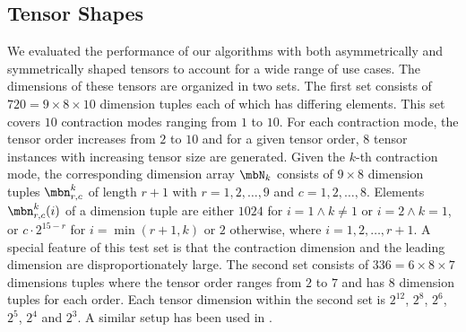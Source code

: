 \subsection{Tensor Shapes} 
We evaluated the performance of our algorithms with both asymmetrically and symmetrically shaped tensors to account for a wide range of use cases. 
The dimensions of these tensors are organized in two sets. 
The first set consists of $720 = 9\times 8 \times 10$ dimension tuples each of which has differing elements.
This set covers $10$ contraction modes ranging from $1$ to $10$.
For each contraction mode, the tensor order increases from $2$ to $10$ and for a given tensor order, $8$ tensor instances with increasing tensor size are generated.
Given the $k$-th contraction mode, the corresponding dimension array $\mbN_k$ consists of $9 \times 8$ dimension tuples $\mbn_{r,c}^k$ of length $r+1$ with $r = 1,2,\dots,9$ and $c = 1,2,\dots,8$.
Elements $\mbn_{r,c}^k(i)$ of a dimension tuple are either $1024$ for $i = 1 \wedge k \neq 1$ or $i = 2 \wedge k = 1$, or $c \cdot 2^{15-r}$ for $i = \min(r+1,k)$ or $2$ otherwise, where $i = 1,2,\dots,r+1$.
A special feature of this test set is that the contraction dimension and the leading dimension are disproportionately large.
The second set consists of $336 = 6\times8\times 7$ dimensions tuples where the tensor order ranges from $2$ to $7$ and has $8$ dimension tuples for each order.
Each tensor dimension within the second set is $2^{12}$, $2^{8}$, $2^{6}$, $2^5$, $2^4$ and $2^3$.
A similar setup has been used in \cite{bassoy:2019:ttv, bassoy:2018:fast}.
